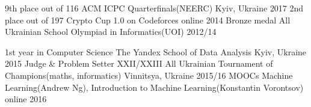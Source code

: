 






\begin{cvhonors}
  \cvhonor
    {9th place out of 116}
    {ACM ICPC Quarterfinals(NEERC)}
    {Kyiv, Ukraine}
    {2017}
  \cvhonor
    {2nd place out of 197}
    {Crypto Cup 1.0 on Codeforces}
    {online}
    {2014}
  \cvhonor
    {Bronze medal}
    {All Ukrainian School Olympiad in Informatics(UOI)}
    {}
    {2012/14}
\end{cvhonors}

\begin{cvhonors}
  \cvhonor
    {1st year in Computer Science}
    {The Yandex School of Data Analysis}
    {Kyiv, Ukraine}
    {2015}
  \cvhonor
    {Judge \& Problem Setter}
    {XXII/XXIII All Ukrainian Tournament of Champions(maths, informatics)}
    {Vinnitsya, Ukraine}
    {2015/16}
  \cvhonor
    {MOOCs}
    {Machine Learning(Andrew Ng), Introduction to Machine Learning(Konstantin Vorontsov)}
    {online}
    {2016}
\end{cvhonors}
